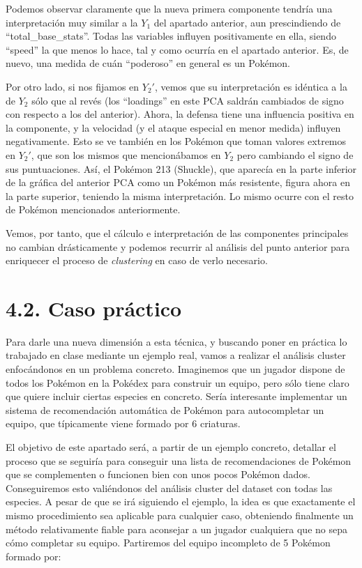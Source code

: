 \documentclass[
  11.8pt,
]{extreport}
\begin{document}
Podemos observar claramente que la nueva primera componente tendría una
interpretación muy similar a la \(Y_1\) del apartado anterior, aun
prescindiendo de ``total\_base\_stats''. Todas las variables influyen
positivamente en ella, siendo ``speed'' la que menos lo hace, tal y como
ocurría en el apartado anterior. Es, de nuevo, una medida de cuán
``poderoso'' en general es un Pokémon.

Por otro lado, si nos fijamos en \(Y_2'\), vemos que su interpretación
es idéntica a la de \(Y_2\) sólo que al revés (los ``loadings'' en este
PCA saldrán cambiados de signo con respecto a los del anterior). Ahora,
la defensa tiene una influencia positiva en la componente, y la
velocidad (y el ataque especial en menor medida) influyen negativamente.
Esto se ve también en los Pokémon que toman valores extremos en
\(Y_2'\), que son los mismos que mencionábamos en \(Y_2\) pero cambiando
el signo de sus puntuaciones. Así, el Pokémon 213 (Shuckle), que
aparecía en la parte inferior de la gráfica del anterior PCA como un
Pokémon más resistente, figura ahora en la parte superior, teniendo la
misma interpretación. Lo mismo ocurre con el resto de Pokémon
mencionados anteriormente.

Vemos, por tanto, que el cálculo e interpretación de las componentes
principales no cambian drásticamente y podemos recurrir al análisis del
punto anterior para enriquecer el proceso de \emph{clustering} en caso
de verlo necesario.

\section{4.2. Caso práctico}\label{caso-pruxe1ctico}

Para darle una nueva dimensión a esta técnica, y buscando poner en
práctica lo trabajado en clase mediante un ejemplo real, vamos a
realizar el análisis cluster enfocándonos en un problema concreto.
Imaginemos que un jugador dispone de todos los Pokémon en la Pokédex
para construir un equipo, pero sólo tiene claro que quiere incluir
ciertas especies en concreto. Sería interesante implementar un sistema
de recomendación automática de Pokémon para autocompletar un equipo, que
típicamente viene formado por 6 criaturas.

El objetivo de este apartado será, a partir de un ejemplo concreto,
detallar el proceso que se seguiría para conseguir una lista de
recomendaciones de Pokémon que se complementen o funcionen bien con unos
pocos Pokémon dados. Conseguiremos esto valiéndonos del análisis cluster
del dataset con todas las especies. A pesar de que se irá siguiendo el
ejemplo, la idea es que exactamente el mismo procedimiento sea aplicable
para cualquier caso, obteniendo finalmente un método relativamente
fiable para aconsejar a un jugador cualquiera que no sepa cómo completar
su equipo. Partiremos del equipo incompleto de 5 Pokémon formado por:
\end{document}
